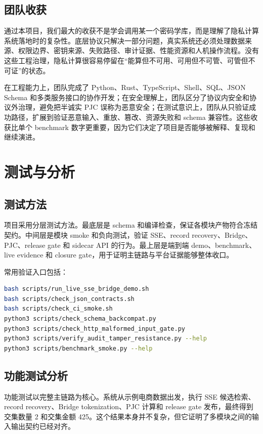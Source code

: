 \documentclass[UTF8,a4paper,12pt,oneside]{ctexrep}
\begin{document}
\section{团队收获}

通过本项目，我们最大的收获不是学会调用某一个密码学库，而是理解了隐私计算系统落地时的复杂性。底层协议只解决一部分问题，真实系统还必须处理数据来源、权限边界、密钥来源、失败路径、审计证据、性能资源和人机操作流程。没有这些工程治理，隐私计算很容易停留在“能算但不可用、可用但不可管、可管但不可证”的状态。

在工程能力上，团队完成了 Python、Rust、TypeScript、Shell、SQL、JSON Schema 和多类服务接口的协作开发；在安全理解上，团队区分了协议内安全和协议外治理，避免把半诚实 PJC 误称为恶意安全；在测试意识上，团队从只验证成功路径，扩展到验证恶意输入、重放、篡改、资源失败和 schema 兼容性。这些收获比单个 benchmark 数字更重要，因为它们决定了项目是否能够被解释、复现和继续演进。

\chapter{测试与分析}

\section{测试方法}

项目采用分层测试方法。最底层是 schema 和编译检查，保证各模块产物符合冻结契约。中间层是模块 smoke 和负向测试，验证 SSE、record recovery、Bridge、PJC、release gate 和 sidecar API 的行为。最上层是端到端 demo、benchmark、live evidence 和 closure gate，用于证明主链路与平台证据能够整体收口。

常用验证入口包括：

\begin{lstlisting}[language=bash]
bash scripts/run_live_sse_bridge_demo.sh
bash scripts/check_json_contracts.sh
bash scripts/check_ci_smoke.sh
python3 scripts/check_schema_backcompat.py
python3 scripts/check_http_malformed_input_gate.py
python3 scripts/verify_audit_tamper_resistance.py --help
python3 scripts/benchmark_smoke.py --help
\end{lstlisting}

\section{功能测试分析}

功能测试以完整主链路为核心。系统从示例电商数据出发，执行 SSE 候选检索、record recovery、Bridge tokenization、PJC 计算和 release gate 发布，最终得到交集数量 2 和交集金额 425。这个结果本身并不复杂，但它证明了多模块之间的输入输出契约已经对齐。
\end{document}
